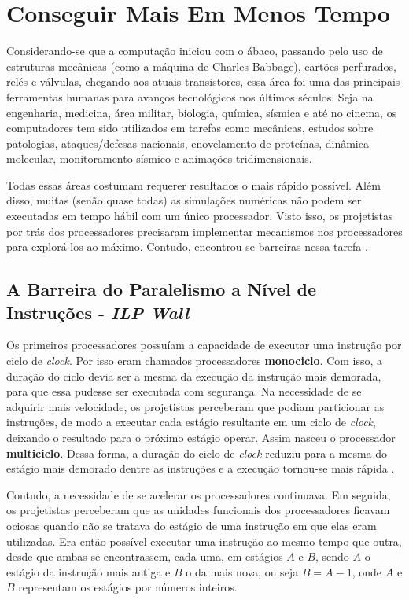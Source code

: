 \section{Conseguir Mais Em Menos Tempo}

Considerando-se que a computação iniciou com o ábaco, passando pelo uso de estruturas 
mecânicas (como a máquina de Charles Babbage), cartões perfurados,  relés e válvulas, 
chegando aos atuais transistores, essa área foi uma das principais ferramentas humanas para avanços
tecnológicos nos últimos séculos. Seja na engenharia, medicina, área
militar, biologia, química, sísmica e até no cinema, os computadores tem
sido utilizados em tarefas como mecânicas, estudos sobre patologias,
ataques/defesas nacionais, enovelamento de proteínas, dinâmica molecular,
monitoramento sísmico e animações tridimensionais.

Todas essas áreas costumam requerer  resultados o mais rápido possível. Além disso,
muitas (senão quase todas) as simulações numéricas não podem ser executadas em tempo 
hábil com um único processador. Visto
isso, os projetistas por trás dos processadores precisaram
implementar mecanismos nos processadores para explorá-los ao máximo. Contudo, 
encontrou-se barreiras nessa tarefa \cite{pacheco:intro-par-prog}.

\subsection{A Barreira do Paralelismo a Nível de Instruções - \textit{ILP Wall}}

Os primeiros processadores possuíam a capacidade de
executar uma instrução por ciclo de \textit{clock}. Por isso eram chamados 
processadores \textbf{monociclo}. Com isso, a duração
do ciclo devia ser a mesma da execução da instrução mais demorada, para que 
essa pudesse ser executada com segurança.
Na necessidade de se adquirir mais velocidade,
os projetistas perceberam que podiam particionar as instruções, de modo
a executar cada estágio resultante em um ciclo de \textit{clock},
deixando o resultado para o próximo estágio operar. Assim
nasceu o processador \textbf{multiciclo}. Dessa forma, a duração
do ciclo de \textit{clock} reduziu para a mesma do estágio mais
demorado dentre as instruções e a execução tornou-se mais rápida \cite{Hennessy-1}.

Contudo, a necessidade de se acelerar os processadores continuava. Em
seguida, os projetistas perceberam que as unidades funcionais dos
processadores ficavam ociosas quando não se tratava do estágio de uma
instrução em que elas eram utilizadas. Era então possível executar uma
instrução ao mesmo tempo que outra, desde que ambas se encontrassem,
cada uma, em estágios $A$ e $B$, sendo $A$ o estágio da instrução mais
antiga e $B$ o da mais nova, ou seja $B = A - 1$, onde $A$ e $B$ 
representam os estágios por números inteiros.

